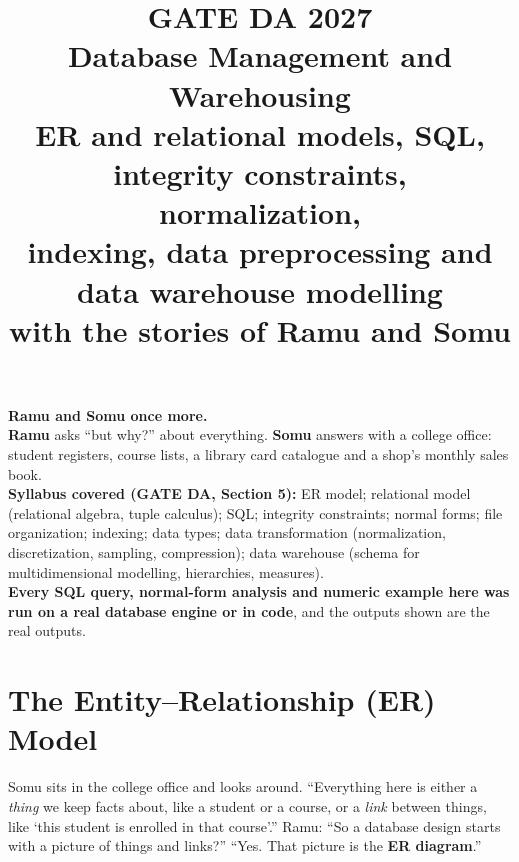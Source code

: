 \documentclass[11pt,a4paper]{article}
\title{\Huge\bfseries GATE DA 2027\\[4pt] \Large Database Management and Warehousing\\[8pt]
\large ER and relational models, SQL, integrity constraints, normalization,\\indexing, data preprocessing and data warehouse modelling\\
with the stories of Ramu and Somu}
\author{}
\date{}
\begin{document}
\maketitle
\thispagestyle{empty}

\begin{center}
\begin{tcolorbox}[colback=yellow!10,colframe=orange!80!black,width=0.9\textwidth,breakable]
\textbf{Ramu and Somu once more.}\\
\textbf{Ramu} asks ``but why?'' about everything. \textbf{Somu} answers with a college office: student registers, course lists, a library card catalogue and a shop's monthly sales book.\\[4pt]
\textbf{Syllabus covered (GATE DA, Section 5):} ER model; relational model (relational algebra, tuple calculus); SQL; integrity constraints; normal forms; file organization; indexing; data types; data transformation (normalization, discretization, sampling, compression); data warehouse (schema for multidimensional modelling, hierarchies, measures).\\[4pt]
\textbf{Every SQL query, normal-form analysis and numeric example here was run on a real database engine or in code}, and the outputs shown are the real outputs.
\end{tcolorbox}
\end{center}

\tableofcontents
\newpage

\section{The Entity--Relationship (ER) Model}

\begin{story}
Somu sits in the college office and looks around. ``Everything here is either a \emph{thing} we keep facts about, like a student or a course, or a \emph{link} between things, like `this student is enrolled in that course'.'' Ramu: ``So a database design starts with a picture of things and links?'' ``Yes. That picture is the \textbf{ER diagram}.''
\end{story}
\end{document}
